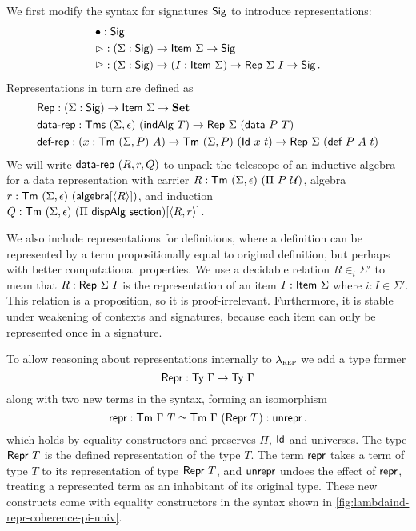 We first modify the syntax for signatures $\textsf{Sig}$ to introduce representations:
\begin{align*}
	 & \bullet : \Sig \\
	 & \rhd : (\Sigma : \Sig) \to \Item\ \Sigma \to \Sig \\
	 & \unrhd : (\Sigma : \Sig) \to (I : \Item\ \Sigma) \to \Rep\ \Sigma\ I \to \Sig \,.
\end{align*}
Representations in turn are defined as
\begin{align*}
& \Rep : (\Sigma : \Sig) \to \Item\ \Sigma \to \Set \\
& \mta{data-rep} : \Tms\ (\Sigma, \epsilon)\ (\mta{indAlg}\ T) \to \Rep\ \Sigma\ (\mta{data}\ P\ T) \\
& \mta{def-rep} : (x : \Tm\ (\Sigma, P)\ A) \to \Tm\ (\Sigma, P)\ (\mta{Id}\ x\ t) \to \Rep\ \Sigma\ (\mta{def}\ P\ A\ t)
\end{align*}
We will write $\textsf{data-rep}\ (R, r, Q)$ to unpack the telescope of an
inductive algebra for a data representation with carrier $R : \textsf{Tm}\ (\Sigma,
\epsilon)\ (\Pi\ P\ \mathcal{U})$, algebra $r : \textsf{Tm}\ (\Sigma, \epsilon)\
(\textsf{algebra}[\langle R\rangle])$, and induction $Q : \textsf{Tm}\ (\Sigma, \epsilon)\ (\Pi\
\textsf{dispAlg}\ \textsf{section})[\langle R, r\rangle]$.

We also include representations for definitions, where a definition can be
represented by a term propositionally equal to original definition, but perhaps
with better computational properties.
We use a decidable relation $R \in_i \Sigma'$ to mean that $R :
\textsf{Rep}\ \Sigma\ I$ is the representation of an item $I : \textsf{Item}\ \Sigma$
where $i : I \in \Sigma'$.
This relation is a proposition, so it is proof-irrelevant. Furthermore, it is stable under
weakening of contexts and signatures, because each item can only be represented once in a signature.



To allow reasoning about representations internally to $\lambda_{\textsc{rep}}$ we add a
type former
\begin{equation}\label{eq:repr-ty}
	\textsf{Repr}{} : \textsf{Ty}\ \Gamma \to \textsf{Ty}\ \Gamma
\end{equation}
along with two new terms in the syntax, forming an isomorphism
\begin{equation}\label{eq:repr-iso}
	\textsf{repr}{} : \textsf{Tm}\ \Gamma\ T \simeq \textsf{Tm}\ \Gamma\ (\textsf{Repr}\ T) : \textsf{unrepr}{} \,.
\end{equation}
which holds by equality constructors and preserves $\Pi$, $\textsf{Id}$ and
universes. The type $\MRepr\ T$ is the defined representation of the type $T$.
The term $\textsf{repr}{}$ takes a term of type $T$ to its representation of type
$\MRepr\ T$, and $\textsf{unrepr}{}$ undoes the effect of $\textsf{repr}{}$, treating a
represented term as an inhabitant of its original type. These new constructs
come with equality constructors in the syntax
shown in \cref{fig:lambdaind-repr-coherence-pi-univ}.


